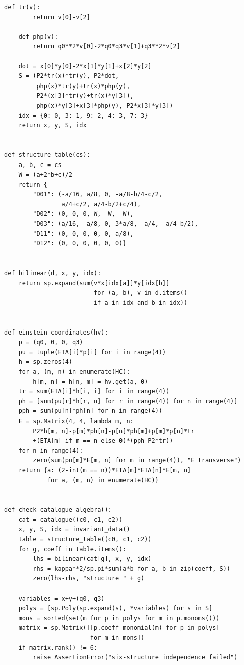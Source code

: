 \documentclass[11pt,a4paper]{article}
\theoremstyle{plain}
\theoremstyle{definition}
\theoremstyle{remark}
\numberwithin{equation}{section}
\begin{document}
\begin{lstlisting}[caption={Consolidated exact checker and coverage-aware optional replay.},
                  label={lst:program}]
    def tr(v):
        return v[0]-v[2]

    def php(v):
        return q0**2*v[0]-2*q0*q3*v[1]+q3**2*v[2]

    dot = x[0]*y[0]-2*x[1]*y[1]+x[2]*y[2]
    S = (P2*tr(x)*tr(y), P2*dot,
         php(x)*tr(y)+tr(x)*php(y),
         P2*(x[3]*tr(y)+tr(x)*y[3]),
         php(x)*y[3]+x[3]*php(y), P2*x[3]*y[3])
    idx = {0: 0, 3: 1, 9: 2, 4: 3, 7: 3}
    return x, y, S, idx


def structure_table(cs):
    a, b, c = cs
    W = (a+2*b+c)/2
    return {
        "D01": (-a/16, a/8, 0, -a/8-b/4-c/2,
                a/4+c/2, a/4-b/2+c/4),
        "D02": (0, 0, 0, W, -W, -W),
        "D03": (a/16, -a/8, 0, 3*a/8, -a/4, -a/4-b/2),
        "D11": (0, 0, 0, 0, 0, a/8),
        "D12": (0, 0, 0, 0, 0, 0)}


def bilinear(d, x, y, idx):
    return sp.expand(sum(v*x[idx[a]]*y[idx[b]]
                         for (a, b), v in d.items()
                         if a in idx and b in idx))


def einstein_coordinates(hv):
    p = (q0, 0, 0, q3)
    pu = tuple(ETA[i]*p[i] for i in range(4))
    h = sp.zeros(4)
    for a, (m, n) in enumerate(HC):
        h[m, n] = h[n, m] = hv.get(a, 0)
    tr = sum(ETA[i]*h[i, i] for i in range(4))
    ph = [sum(pu[r]*h[r, n] for r in range(4)) for n in range(4)]
    pph = sum(pu[n]*ph[n] for n in range(4))
    E = sp.Matrix(4, 4, lambda m, n:
        P2*h[m, n]-p[m]*ph[n]-p[n]*ph[m]+p[m]*p[n]*tr
        +(ETA[m] if m == n else 0)*(pph-P2*tr))
    for n in range(4):
        zero(sum(pu[m]*E[m, n] for m in range(4)), "E transverse")
    return {a: (2-int(m == n))*ETA[m]*ETA[n]*E[m, n]
            for a, (m, n) in enumerate(HC)}


def check_catalogue_algebra():
    cat = catalogue((c0, c1, c2))
    x, y, S, idx = invariant_data()
    table = structure_table((c0, c1, c2))
    for g, coeff in table.items():
        lhs = bilinear(cat[g], x, y, idx)
        rhs = kappa**2/sp.pi*sum(a*b for a, b in zip(coeff, S))
        zero(lhs-rhs, "structure " + g)

    variables = x+y+(q0, q3)
    polys = [sp.Poly(sp.expand(s), *variables) for s in S]
    mons = sorted(set(m for p in polys for m in p.monoms()))
    matrix = sp.Matrix([[p.coeff_monomial(m) for p in polys]
                        for m in mons])
    if matrix.rank() != 6:
        raise AssertionError("six-structure independence failed")


\end{lstlisting}
\end{document}
